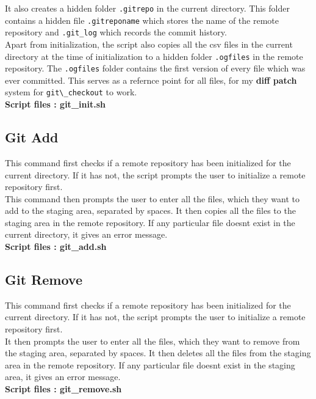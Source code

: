\documentclass{article}
\begin{document}
It also creates a hidden folder \verb".gitrepo" in the current directory. This folder contains a hidden file \verb".gitreponame" which stores the name of the remote repository and \verb".git_log" which records the commit history.\\

Apart from initialization, the script also copies all the csv files in the current directory at the time of initialization to a hidden folder \verb".ogfiles" in the remote repository. The \verb".ogfiles" folder contains the first version of every file which was ever committed. This serves as a refernce point for all files, for my \textbf{diff patch} system for \verb"git\_checkout" to work.\\

\textbf{Script files : git\_init.sh}
\subsection{Git Add}
This command first checks if a remote repository has been initialized for the current directory. If it has not, the script prompts the user to initialize a remote repository first.\\
This command then prompts the user to enter all the files, which they want to add to the staging area, separated by spaces. It then copies all the files to the staging area in the remote repository. If any particular file doesnt exist in the current directory, it gives an error message.\\
\textbf{Script files : git\_add.sh}

\subsection{Git Remove}
This command first checks if a remote repository has been initialized for the current directory. If it has not, the script prompts the user to initialize a remote repository first.\\
It then prompts the user to enter all the files, which they want to remove from the staging area, separated by spaces. It then deletes all the files from the staging area in the remote repository. If any particular file doesnt exist in the staging area, it gives an error message.\\

\textbf{Script files : git\_remove.sh}
\end{document}
